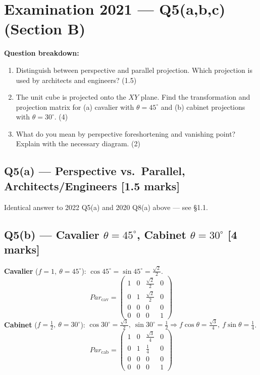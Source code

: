 \documentclass[12pt, a4paper]{article}
\newenvironment{solutionbox}{\begin{mdframed}[style=solutionframe]}{\end{mdframed}}
\newenvironment{answerbox}{\begin{mdframed}[style=answerframe]}{\end{mdframed}}
\begin{document}
\section{Examination 2021 --- Q5(a,b,c) (Section B)}
\begin{solutionbox}
\textbf{Question breakdown:}
\begin{enumerate}[noitemsep]
  \item[Q5(a)] Distinguish between perspective and parallel projection. Which projection is used by architects and engineers? (1.5)
  \item[Q5(b)] The unit cube is projected onto the $XY$ plane. Find the transformation and projection matrix for (a) cavalier with $\theta=45^\circ$ and (b) cabinet projections with $\theta=30^\circ$. (4)
  \item[Q5(c)] What do you mean by perspective foreshortening and vanishing point? Explain with the necessary diagram. (2)
\end{enumerate}
\end{solutionbox}

\subsection*{Q5(a) --- Perspective vs.\ Parallel, Architects/Engineers [1.5 marks]}
\begin{answerbox}
Identical answer to 2022 Q5(a) and 2020 Q8(a) above --- see \S1.1.
\end{answerbox}

\subsection*{Q5(b) --- Cavalier $\theta=45^\circ$, Cabinet $\theta=30^\circ$ [4 marks]}
\begin{solutionbox}
\textbf{Cavalier} ($f=1,\ \theta=45^\circ$): $\cos45^\circ=\sin45^\circ=\tfrac{\sqrt2}{2}$.
$$Par_{\text{cav}} = \begin{pmatrix}1&0&\tfrac{\sqrt2}{2}&0\\0&1&\tfrac{\sqrt2}{2}&0\\0&0&0&0\\0&0&0&1\end{pmatrix}$$
\textbf{Cabinet} ($f=\tfrac12,\ \theta=30^\circ$): $\cos30^\circ=\tfrac{\sqrt3}{2},\ \sin30^\circ=\tfrac12 \Rightarrow f\cos\theta=\tfrac{\sqrt3}{4},\ f\sin\theta=\tfrac14$.
$$Par_{\text{cab}} = \begin{pmatrix}1&0&\tfrac{\sqrt3}{4}&0\\0&1&\tfrac14&0\\0&0&0&0\\0&0&0&1\end{pmatrix}$$
\end{solutionbox}
\end{document}
